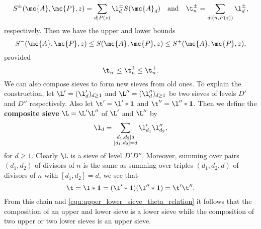     \[
      S^{\pm}(\mc{A},\mc{P},z) = \sum_{d \mid P(z)}\l_{d}^{\pm}S(\mc{A}_{d}) \quad \text{and} \quad \t_{n}^{\pm} = \sum_{d \mid (n,P(z))}\l_{d}^{\pm},
    \]
    respectively. Then we have the upper and lower bounds
    \[
      S^{-}(\mc{A},\mc{P},z) \le S(\mc{A},\mc{P},z) \le S^{+}(\mc{A},\mc{P},z),
    \]
    provided
    \begin{equation}\label{equ:upper_lower_sieve_theta_relation}
      \t_{n}^{-} \le \t_{n}^{0} \le \t_{n}^{+}.
    \end{equation}
    We can also compose sieves to form new sieves from old ones. To explain the construction, let $\L' = (\l'_{d})_{d \ge 1}$ and $\L'' = (\l''_{d})_{d \ge 1}$ be two sieves of levels $D'$ and $D''$ respectively. Also let $\t' = \l' \ast \mathbf{1}$ and $\t'' = \l'' \ast \mathbf{1}$. Then we define the \textbf{composite sieve} $\L = \L'\L''$ of $\L'$ and $\L''$ by
    \[
      \l_{d} = \sum_{\substack{ d_{1},d_{2} \mid d \\ [d_{1},d_{2}] = d}}\l'_{d_{1}}\l''_{d_{2}},
    \]
    for $d \ge 1$. Clearly $\L$ is a sieve of level $D'D''$. Moreover, summing over pairs $(d_{1},d_{2})$ of divisors of $n$ is the same as summing over triples $(d_{1},d_{2},d)$ of divisors of $n$ with $[d_{1},d_{2}] = d$, we see that
    \[
      \t = \l \ast \mathbf{1} = (\l' \ast \mathbf{1})(\l'' \ast \mathbf{1}) = \t'\t''.
    \]
    From this chain and \cref{equ:upper_lower_sieve_theta_relation} it follows that the composition of an upper and lower sieve is a lower sieve while the composition of two upper or two lower sieves is an upper sieve.
